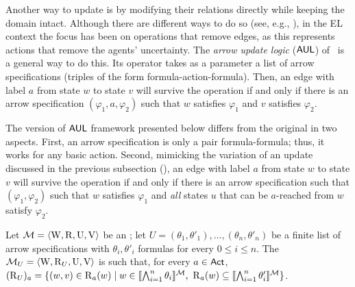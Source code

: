\begin{textonuevo}
Another way to update \ltss is by modifying their relations directly while keeping the domain intact. Although there are different ways to do so (see, e.g., \cite{ArecesFH15}), in the EL context the focus has been on operations that remove edges, as this represents actions that remove the agents' uncertainty. The \emph{arrow update logic} ($\mathsf{AUL}$) of~\cite{KooiR11} is a general way to do this. Its operator takes as a parameter a list of arrow specifications (triples of the form formula-action-formula). Then, an edge with label $a$ from state $w$ to state $v$ will survive the operation if and only if there is an arrow specification $(\varphi_1, a, \varphi_2)$ such that $w$ satisfies $\varphi_1$ and $v$ satisfies $\varphi_2$. 

\medskip 

The version of $\mathsf{AUL}$ framework presented below differs from the original in two aspects. First, an arrow specification is only a pair formula-formula; thus, it works for any basic action. Second, mimicking the variation of an update discussed in the previous subsection (), an edge with label $a$ from state $w$ to state $v$ will survive the operation if and only if there is an arrow specification such that $(\varphi_1, \varphi_2)$ such that $w$ satisfies $\varphi_1$ and \emph{all} states $u$ that can be $a$-reached from $w$ satisfy $\varphi_2$.
\end{textonuevo}

\medskip 

\begin{definition}
Let $\mathcal{M} = \langle \operatorname{W}, \operatorname{R}, \operatorname{U}, \operatorname{V} \rangle$ be an \ults; let $U = (\theta_1,\theta'_1),\dots,(\theta_n,\theta'_n)$ be a finite list of arrow specifications with $\theta_i,\theta'_i$ formulas for every $0\leq i \leq n$. The \ults $\mathcal{M}_{{U}} = \langle \operatorname{W}, \operatorname{R}_{{U}}, \operatorname{U},\operatorname{V} \rangle$ is such that, for every $a\in{\rm \sf Act}$,
	$(\operatorname{R}_{{U}})_a = \{ (w,v) \in \operatorname{R}_a(w) \mid w \in \llbracket \bigwedge_{i=1}^n \theta_i \rrbracket^{\mathcal{M}} \text{, } \operatorname{R}_a(w) \subseteq \llbracket \bigwedge_{i=1}^n \theta'_i \rrbracket^{\mathcal{M}} \}$.
\end{definition}

